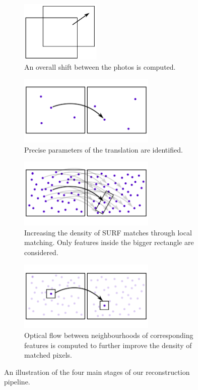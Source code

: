 \begin{figure}[H]
\centering

\begin{subfigure}[b]{0.45\textwidth}
\centering
\includegraphics[width=3.8cm]{img/impl0.pdf}
\caption{An overall shift between the photos is computed.} \label{impl1}
\end{subfigure}
\begin{subfigure}[b]{0.45\textwidth}
\centering
\includegraphics[width=6.5cm]{img/impl1.pdf}
\caption{Precise parameters of the translation are identified.} \label{impl1}
\end{subfigure}
\begin{subfigure}[b]{0.45\textwidth}
\centering
\includegraphics[width=6.5cm]{img/impl2.pdf}
\caption{Increasing the density of SURF matches through local matching. Only features inside the bigger rectangle are considered.} \label{impl1}
\end{subfigure}
\begin{subfigure}[b]{0.45\textwidth}
\centering
\includegraphics[width=6.5cm]{img/impl3.pdf}
\caption{Optical flow between neighbourhoods of corresponding features is computed to further improve the density of matched pixels.} \label{impl1}
\end{subfigure}

\caption[]{An illustration of the four main stages of our reconstruction pipeline.} 
\label{fig:impl}
\end{figure}

